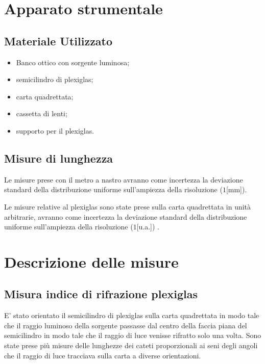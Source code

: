 \documentclass{article}
\begin{document}
 

\section{Apparato strumentale}


\subsection{Materiale Utilizzato}


\begin{itemize}

\item Banco ottico con sorgente luminosa;
\item semicilindro di plexiglas;
\item carta quadrettata;
\item cassetta di lenti;
\item supporto per il plexiglas.

\end{itemize} 

\subsection{Misure di lunghezza}

Le misure prese con il metro a nastro avranno come incertezza la deviazione standard della distribuzione uniforme sull'ampiezza della risoluzione ($1$[mm]).

Le misure relative al plexiglas sono state prese sulla carta quadrettata in unità arbitrarie, avranno come incertezza la deviazione standard della distribuzione uniforme sull'ampiezza della risoluzione ($1$[u.a.]) .

\section{Descrizione delle misure}

\subsection{Misura indice di rifrazione plexiglas}
 
E' stato orientato il semicilindro di plexiglas sulla carta quadrettata in modo tale che il raggio luminoso della sorgente passasse dal centro della faccia piana del semicilindro in modo tale che il raggio di luce venisse rifratto solo una volta. 
Sono state prese più misure delle lunghezze dei cateti proporzionali ai seni  degli angoli che il raggio di luce tracciava sulla carta a diverse orientazioni.
\end{document}

